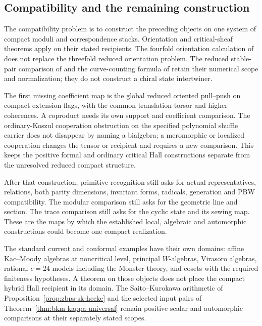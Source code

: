 \subsection{Compatibility and the remaining construction}
\label{app:G-retained-data-compatibility}
\label{app:G-relative-theorem}

The compatibility problem is to construct the preceding objects
on one system of compact moduli and correspondence stacks.
Orientation and critical-sheaf theorems apply on their stated
recipients. The fourfold orientation calculation of
\cite{CaoKoolMonavari} does not replace the threefold reduced
orientation problem. The reduced stable-pair comparison of
\cite{OberdieckK3xE} and the curve-counting formula of \cite{OB}
retain their numerical scope and normalization; they do not
construct a chiral state intertwiner.

The first missing coefficient map is the global reduced oriented
pull--push on compact extension flags, with the common translation
torsor and higher coherences. A coproduct needs its own support and
coefficient comparison. The ordinary-Koszul cooperation obstruction
on the specified polynomial shuffle carrier does not disappear by
naming a bialgebra; a meromorphic or localized cooperation changes
the tensor or recipient and requires a new comparison. This keeps
the positive formal and ordinary critical Hall constructions
separate from the unresolved reduced compact structure.

After that construction, primitive recognition still asks for
actual representatives, relations, both parity dimensions,
invariant forms, radicals, generation and PBW compatibility.
The modular comparison still asks for the geometric line and
section. The trace comparison still asks for the cyclic state and
its sewing map. These are the maps by which the established local,
algebraic and automorphic constructions could become one compact
realization.

The standard current and conformal examples have their own domains:
affine Kac--Moody algebras at noncritical level, principal
\(W\)-algebras, Virasoro algebras, rational \(c=24\) models
including the Monster theory, and cosets with the required
finiteness hypotheses. A theorem on those objects does not place
the compact hybrid Hall recipient in its domain. The
Saito--Kurokawa arithmetic of Proposition~\ref{prop:zbps-sk-hecke}
and the selected input pairs of
Theorem~\ref{thm:bkm-kappa-universal} remain positive scalar and
automorphic comparisons at their separately stated scopes.
